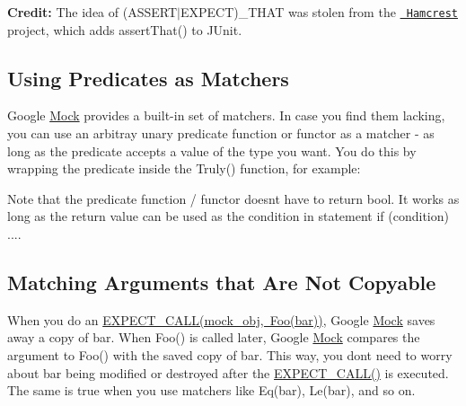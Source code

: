 {\bfseries{Credit\+:}} The idea of {\ttfamily (A\+S\+S\+E\+R\+T$\vert$\+E\+X\+P\+E\+CT)\+\_\+\+T\+H\+AT} was stolen from the \href{https://github.com/hamcrest/}{\texttt{ Hamcrest}} project, which adds {\ttfamily assert\+That()} to J\+Unit.

\subsection*{Using Predicates as Matchers}

Google \mbox{\hyperlink{class_mock}{Mock}} provides a built-\/in set of matchers. In case you find them lacking, you can use an arbitray unary predicate function or functor as a matcher -\/ as long as the predicate accepts a value of the type you want. You do this by wrapping the predicate inside the {\ttfamily Truly()} function, for example\+:


\begin{DoxyCode}{0}
\DoxyCodeLine{}
\DoxyCodeLine{}
\DoxyCodeLine{  \textcolor{comment}{// Bar() must be called with an even number.}}
\end{DoxyCode}


Note that the predicate function / functor doesn\textquotesingle{}t have to return {\ttfamily bool}. It works as long as the return value can be used as the condition in statement {\ttfamily if (condition) ...}.

\subsection*{Matching Arguments that Are Not Copyable}

When you do an {\ttfamily \mbox{\hyperlink{_obj__test_2lib_2googletest-release-1_88_81_2googlemock_2include_2gmock_2gmock-spec-builders_8h_a535a6156de72c1a2e25a127e38ee5232}{E\+X\+P\+E\+C\+T\+\_\+\+C\+A\+L\+L(mock\+\_\+obj, Foo(bar))}}}, Google \mbox{\hyperlink{class_mock}{Mock}} saves away a copy of {\ttfamily bar}. When {\ttfamily Foo()} is called later, Google \mbox{\hyperlink{class_mock}{Mock}} compares the argument to {\ttfamily Foo()} with the saved copy of {\ttfamily bar}. This way, you don\textquotesingle{}t need to worry about {\ttfamily bar} being modified or destroyed after the {\ttfamily \mbox{\hyperlink{googletest-master_2googlemock_2include_2gmock_2gmock-spec-builders_8h_a535a6156de72c1a2e25a127e38ee5232}{E\+X\+P\+E\+C\+T\+\_\+\+C\+A\+L\+L()}}} is executed. The same is true when you use matchers like {\ttfamily Eq(bar)}, {\ttfamily Le(bar)}, and so on.

